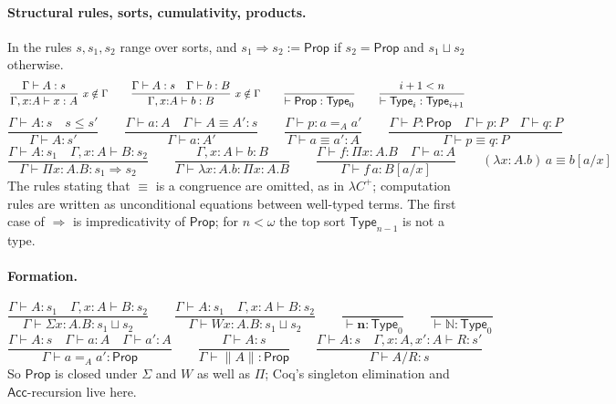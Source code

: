 \documentclass[10pt]{article}
\newcommand{\N}{\mathbb{N}}
\newcommand{\Prop}{\mathsf{Prop}}
\newcommand{\Type}{\mathsf{Type}}
\newcommand{\Acc}{\mathsf{Acc}}
\begin{document}
\paragraph{Structural rules, sorts, cumulativity, products.}
In the rules $s,s_1,s_2$ range over sorts, and
$s_1\Rightarrow s_2:=\Prop$ if $s_2=\Prop$ and $s_1\sqcup s_2$ otherwise.
\[
\frac{\Gamma\vdash A:s}{\Gamma,x{:}A\vdash x:A}\ \text{\small$x\notin\Gamma$}\qquad
\frac{\Gamma\vdash A:s\quad\Gamma\vdash b:B}{\Gamma,x{:}A\vdash b:B}\ \text{\small$x\notin\Gamma$}\qquad
\frac{}{\vdash\Prop:\Type_0}\qquad
\frac{i+1<n}{\vdash\Type_i:\Type_{i+1}}
\]
\[
\frac{\Gamma\vdash A:s\quad s\le s'}{\Gamma\vdash A:s'}\qquad
\frac{\Gamma\vdash a:A\quad\Gamma\vdash A\equiv A':s}{\Gamma\vdash a:A'}\qquad
\frac{\Gamma\vdash p:a=_A a'}{\Gamma\vdash a\equiv a':A}\qquad
\frac{\Gamma\vdash P:\Prop\quad\Gamma\vdash p:P\quad\Gamma\vdash q:P}{\Gamma\vdash p\equiv q:P}
\]
\[
\frac{\Gamma\vdash A:s_1\quad\Gamma,x{:}A\vdash B:s_2}{\Gamma\vdash\Pi x{:}A.B:s_1\Rightarrow s_2}\qquad
\frac{\Gamma,x{:}A\vdash b:B}{\Gamma\vdash\lambda x{:}A.b:\Pi x{:}A.B}\qquad
\frac{\Gamma\vdash f:\Pi x{:}A.B\quad\Gamma\vdash a:A}{\Gamma\vdash f\,a:B[a/x]}\qquad
(\lambda x{:}A.b)\,a\equiv b[a/x]
\]
The rules stating that $\equiv$ is a congruence are omitted, as in
$\lambda C^+$; computation rules are written as unconditional equations
between well-typed terms. The first case of $\Rightarrow$ is impredicativity
of $\Prop$; for $n<\omega$ the top sort $\Type_{n-1}$ is not a type.

\paragraph{Formation.}
\[
\frac{\Gamma\vdash A:s_1\quad\Gamma,x{:}A\vdash B:s_2}{\Gamma\vdash\Sigma x{:}A.B:s_1\sqcup s_2}\qquad
\frac{\Gamma\vdash A:s_1\quad\Gamma,x{:}A\vdash B:s_2}{\Gamma\vdash W x{:}A.B:s_1\sqcup s_2}\qquad
\frac{}{\vdash\mathbf n:\Type_0}\qquad
\frac{}{\vdash\N:\Type_0}
\]
\[
\frac{\Gamma\vdash A:s\quad\Gamma\vdash a:A\quad\Gamma\vdash a':A}{\Gamma\vdash a=_A a':\Prop}\qquad
\frac{\Gamma\vdash A:s}{\Gamma\vdash\|A\|:\Prop}\qquad
\frac{\Gamma\vdash A:s\quad\Gamma,x{:}A,x'{:}A\vdash R:s'}{\Gamma\vdash A/R:s}
\]
So $\Prop$ is closed under $\Sigma$ and $W$ as well as $\Pi$; Coq's
singleton elimination and $\Acc$-recursion live here.
\end{document}
